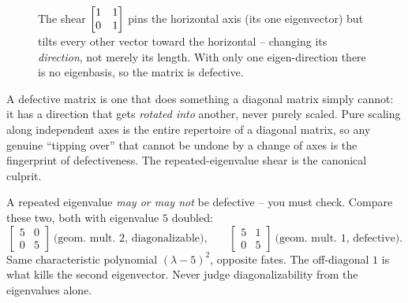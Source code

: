 \begin{figure}[H]
\centering
{}
\caption{The shear $\protect\begin{bmatrix}1&1\\0&1\protect\end{bmatrix}$ pins
the horizontal axis (its one eigenvector) but tilts every other vector toward the
horizontal -- changing its \emph{direction}, not merely its length. With only one
eigen-direction there is no eigenbasis, so the matrix is defective.}
\label{ch24:fig-shear}
\end{figure}

\begin{intuitionbox}
A defective matrix is one that does something a diagonal matrix simply cannot:
it has a direction that gets \emph{rotated into} another, never purely scaled.
Pure scaling along independent axes is the entire repertoire of a diagonal
matrix, so any genuine ``tipping over'' that cannot be undone by a change of axes
is the fingerprint of defectiveness. The repeated-eigenvalue shear is the
canonical culprit.
\end{intuitionbox}

\begin{trapbox}
A repeated eigenvalue \emph{may or may not} be defective -- you must check.
Compare these two, both with eigenvalue $5$ doubled:
\[
  \begin{bmatrix} 5 & 0 \\ 0 & 5 \end{bmatrix}
  \ \text{(geom.\ mult.\ }2\text{, diagonalizable),}
  \qquad
  \begin{bmatrix} 5 & 1 \\ 0 & 5 \end{bmatrix}
  \ \text{(geom.\ mult.\ }1\text{, defective).}
\]
Same characteristic polynomial $(\lambda-5)^2$, opposite fates. The off-diagonal
$1$ is what kills the second eigenvector. Never judge diagonalizability from the
eigenvalues alone.
\end{trapbox}

